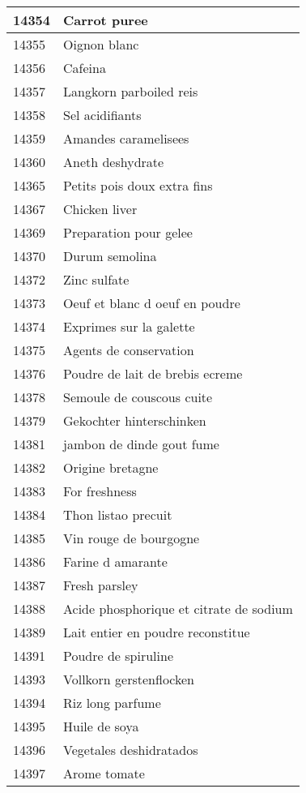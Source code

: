 \begin{longtable}{|l|l|}
14354 & Carrot puree \\ \hline 
14355 & Oignon blanc \\ \hline 
14356 & Cafeina \\ \hline 
14357 & Langkorn parboiled reis \\ \hline 
14358 & Sel acidifiants \\ \hline 
14359 & Amandes caramelisees \\ \hline 
14360 & Aneth deshydrate \\ \hline 
14365 & Petits pois doux extra fins \\ \hline 
14367 & Chicken liver \\ \hline 
14369 & Preparation pour gelee \\ \hline 
14370 & Durum semolina \\ \hline 
14372 & Zinc sulfate \\ \hline 
14373 & Oeuf et blanc d oeuf en poudre \\ \hline 
14374 & Exprimes sur la galette \\ \hline 
14375 & Agents de conservation \\ \hline 
14376 & Poudre de lait de brebis ecreme \\ \hline 
14378 & Semoule de couscous cuite \\ \hline 
14379 & Gekochter hinterschinken \\ \hline 
14381 & jambon de dinde gout fume \\ \hline 
14382 & Origine bretagne \\ \hline 
14383 & For freshness \\ \hline 
14384 & Thon listao precuit \\ \hline 
14385 & Vin rouge de bourgogne \\ \hline 
14386 & Farine d amarante \\ \hline 
14387 & Fresh parsley \\ \hline 
14388 & Acide phosphorique et citrate de sodium \\ \hline 
14389 & Lait entier en poudre reconstitue \\ \hline 
14391 & Poudre de spiruline \\ \hline 
14393 & Vollkorn gerstenflocken \\ \hline 
14394 & Riz long parfume \\ \hline 
14395 & Huile de soya \\ \hline 
14396 & Vegetales deshidratados \\ \hline 
14397 & Arome tomate \\ \hline 

\end{longtable}
